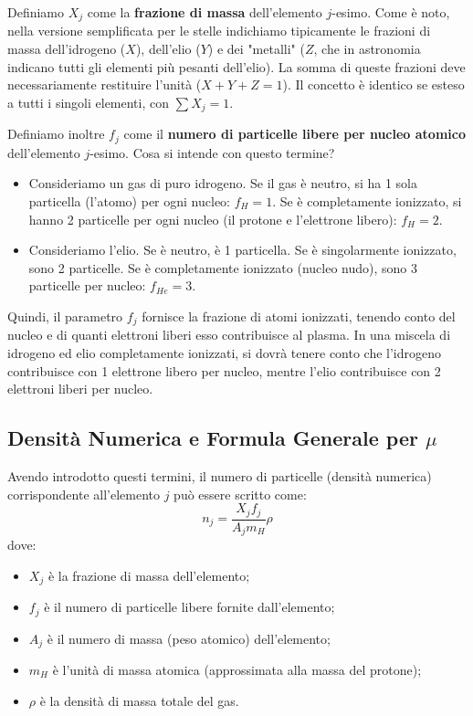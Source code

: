 Definiamo $X_j$ come la \textbf{frazione di massa} dell'elemento $j$-esimo. Come è noto, nella versione semplificata per le stelle indichiamo tipicamente le frazioni di massa dell'idrogeno ($X$), dell'elio ($Y$) e dei "metalli" ($Z$, che in astronomia indicano tutti gli elementi più pesanti dell'elio). La somma di queste frazioni deve necessariamente restituire l'unità ($X+Y+Z=1$). Il concetto è identico se esteso a tutti i singoli elementi, con $\sum X_j = 1$.

Definiamo inoltre $f_j$ come il \textbf{numero di particelle libere per nucleo atomico} dell'elemento $j$-esimo.
Cosa si intende con questo termine?
\begin{itemize}
\item Consideriamo un gas di puro idrogeno. Se il gas è neutro, si ha 1 sola particella (l'atomo) per ogni nucleo: $f_H = 1$. Se è completamente ionizzato, si hanno 2 particelle per ogni nucleo (il protone e l'elettrone libero): $f_H = 2$.
\item Consideriamo l'elio. Se è neutro, è 1 particella. Se è singolarmente ionizzato, sono 2 particelle. Se è completamente ionizzato (nucleo nudo), sono 3 particelle per nucleo: $f_{He} = 3$.
\end{itemize}
Quindi, il parametro $f_j$ fornisce la frazione di atomi ionizzati, tenendo conto del nucleo e di quanti elettroni liberi esso contribuisce al plasma. In una miscela di idrogeno ed elio completamente ionizzati, si dovrà tenere conto che l'idrogeno contribuisce con 1 elettrone libero per nucleo, mentre l'elio contribuisce con 2 elettroni liberi per nucleo.

\subsection{Densità Numerica e Formula Generale per $\mu$}

Avendo introdotto questi termini, il numero di particelle (densità numerica) corrispondente all'elemento $j$ può essere scritto come:
\begin{equation}
n_j = \frac{X_j f_j}{A_j m_H} \rho
\end{equation}
dove:
\begin{itemize}
\item $X_j$ è la frazione di massa dell'elemento;
\item $f_j$ è il numero di particelle libere fornite dall'elemento;
\item $A_j$ è il numero di massa (peso atomico) dell'elemento;
\item $m_H$ è l'unità di massa atomica (approssimata alla massa del protone);
\item $\rho$ è la densità di massa totale del gas.
\end{itemize}

